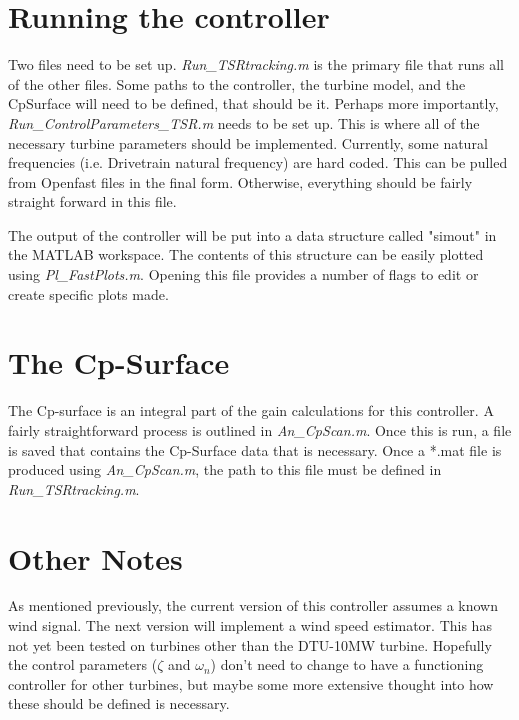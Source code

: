 \documentclass{article}
\begin{document}
\section*{Running the controller}
Two files need to be set up. \textit{Run\_TSRtracking.m} is the primary file that runs all of the other files. Some paths to the controller, the turbine model, and the CpSurface will need to be defined, that should be it. Perhaps more importantly, \textit{Run\_ControlParameters\_TSR.m} needs to be set up. This is where all of the necessary turbine parameters should be implemented. Currently, some natural frequencies (i.e. Drivetrain natural frequency) are hard coded. This can be pulled from Openfast files in the final form. Otherwise, everything should be fairly straight forward in this file. 

The output of the controller will be put into a data structure called "simout" in the MATLAB workspace. The contents of this structure can be easily plotted using \textit{Pl\_FastPlots.m}. Opening this file provides a number of flags to edit or create specific plots made. 

\section*{The Cp-Surface}
The Cp-surface is an integral part of the gain calculations for this controller. A fairly straightforward process is outlined in \textit{An\_CpScan.m}. Once this is run, a file is saved that contains the Cp-Surface data that is necessary. Once a *.mat file is produced using \textit{An\_CpScan.m}, the path to this file must be defined in \textit{Run\_TSRtracking.m}.

\section*{Other Notes}
As mentioned previously, the current version of this controller assumes a known wind signal. The next version will implement a wind speed estimator. This has not yet been tested on turbines other than the DTU-10MW turbine. Hopefully the control parameters ($\zeta$ and $\omega_n$) don't need to change to have a functioning controller for other turbines, but maybe some more extensive thought into how these should be defined is necessary. 
\end{document}
